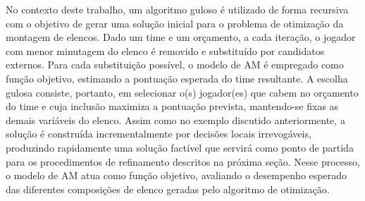 No contexto deste trabalho, um algoritmo guloso é utilizado de forma recursiva com o objetivo de gerar uma solução inicial para o problema de otimização da
montagem de elencos. Dado um time e um orçamento, a cada iteração, o jogador com menor minutagem do elenco é removido e substituído por candidatos externos.
Para cada substituição possível, o modelo de AM é empregado como função objetivo, estimando a pontuação esperada do time resultante. A escolha gulosa
consiste, portanto, em selecionar o(s) jogador(es) que cabem no orçamento do time e cuja inclusão maximiza a pontuação prevista, mantendo-se fixas as
demais variáveis do elenco. Assim como no exemplo discutido anteriormente, a solução é construída incrementalmente por decisões locais irrevogáveis,
produzindo rapidamente uma solução factível que servirá como ponto de partida para os procedimentos de refinamento descritos na próxima seção. 
Nesse processo, o modelo de AM atua como função objetivo, avaliando o desempenho esperado das diferentes composições de elenco geradas pelo algoritmo
de otimização.

